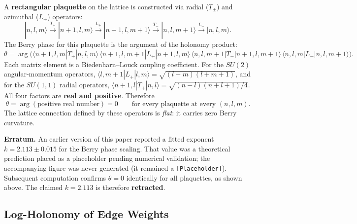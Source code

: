\documentclass[aps,pra,twocolumn,superscriptaddress,longbibliography]{revtex4-2}
\begin{document}
A \textbf{rectangular plaquette} on the lattice is constructed via radial
($T_\pm$) and azimuthal ($L_\pm$) operators:
\begin{equation}
|n, l, m\rangle \xrightarrow{T_+} |n+1, l, m\rangle \xrightarrow{L_+}
|n+1, l, m+1\rangle \xrightarrow{T_-} |n, l, m+1\rangle \xrightarrow{L_-}
|n, l, m\rangle.
\label{eq:plaquette}
\end{equation}
The Berry phase for this plaquette is the argument of the holonomy product:
\begin{equation}
\theta = \arg\!\bigl(
  \langle n\!+\!1,l,m|T_+|n,l,m\rangle\,
  \langle n\!+\!1,l,m\!+\!1|L_+|n\!+\!1,l,m\rangle\,
  \langle n,l,m\!+\!1|T_-|n\!+\!1,l,m\!+\!1\rangle\,
  \langle n,l,m|L_-|n,l,m\!+\!1\rangle
\bigr).
\label{eq:berry_arg}
\end{equation}
Each matrix element is a Biedenharn--Louck coupling coefficient.  For the
$SU(2)$ angular-momentum operators,
$\langle l,m\!+\!1|L_+|l,m\rangle = \sqrt{(l-m)(l+m+1)}$,
and for the $SU(1,1)$ radial operators,
$\langle n\!+\!1,l|T_+|n,l\rangle = \sqrt{(n-l)(n+l+1)/4}$.
All four factors are \textbf{real and positive}.  Therefore
\begin{equation}
\theta = \arg(\text{positive real number}) = 0
\qquad\text{for every plaquette at every $(n,l,m)$.}
\label{eq:berry_zero}
\end{equation}
The lattice connection defined by these operators is \emph{flat}: it carries
zero Berry curvature.

\textbf{Erratum.}  An earlier version of this paper reported a fitted
exponent $k = 2.113 \pm 0.015$ for the Berry phase scaling.  That value was
a theoretical prediction placed as a placeholder pending numerical
validation; the accompanying figure was never generated (it remained a
\texttt{[Placeholder]}).  Subsequent computation confirms
$\theta = 0$ identically for all plaquettes, as shown above.  The claimed
$k = 2.113$ is therefore \textbf{retracted}.

\subsection{Log-Holonomy of Edge Weights}
\end{document}
